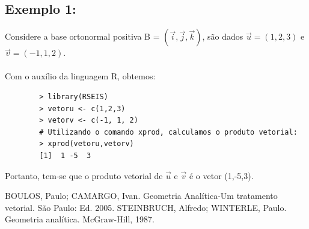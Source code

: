 \documentclass[12pt,a4paper]{article}
\begin{document}
	\subsection*{Exemplo 1:}
	
	Considere a base ortonormal positiva B = $(\vec{i}, \vec{j}, \vec{k})$, são dados $\vec{u} = (1,2,3)$ e $\vec{v} = (-1,1,2). $
	\\
	\\	
	Com o auxílio da linguagem R, obtemos:
	
	\begin{verbatim}
		> library(RSEIS)
		> vetoru <- c(1,2,3)
		> vetorv <- c(-1, 1, 2)
		# Utilizando o comando xprod, calculamos o produto vetorial:
		> xprod(vetoru,vetorv)
		[1]  1 -5  3
	\end{verbatim}
	Portanto, tem-se que o produto vetorial de $\vec{u}$ e $\vec{v}$ é o vetor (1,-5,3).\\
	
	
	
	\begin{thebibliography}{100}
		
		 BOULOS, Paulo; CAMARGO, Ivan. Geometria Analítica-Um tratamento vetorial. São Paulo: Ed. 2005.
		 STEINBRUCH, Alfredo; WINTERLE, Paulo. Geometria analítica. McGraw-Hill, 1987.
	\end{thebibliography}
	
\end{document}
